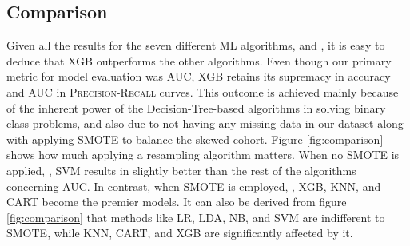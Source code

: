 \subsection{Comparison}
Given all the results for the seven different \acrshort{ML} algorithms,  and , it is easy to deduce that \acrshort{XGB} outperforms the other algorithms. Even though our primary metric for model evaluation was \acrlong{AUC}, \acrshort{XGB} retains its supremacy in accuracy and \acrshort{AUC} in \textsc{Precision-Recall} curves. This outcome is achieved mainly because of the inherent power of the Decision-Tree-based algorithms in solving binary class problems, and also due to not having any missing data in our dataset along with applying \acrshort{SMOTE} to balance the skewed cohort. Figure \ref{fig:comparison} shows how much applying a resampling algorithm matters. When no \acrshort{SMOTE} is applied, , \acrshort{SVM} results in slightly better than the rest of the algorithms concerning \acrshort{AUC}. In contrast, when \acrshort{SMOTE} is employed, , \acrshort{XGB}, \acrshort{KNN}, and \acrshort{CART} become the premier models. It can also be derived from figure \ref{fig:comparison} that methods like \acrshort{LR}, \acrshort{LDA}, \acrshort{NB}, and \acrshort{SVM} are indifferent to \acrshort{SMOTE}, while \acrshort{KNN}, \acrshort{CART}, and \acrshort{XGB} are significantly affected by it.

